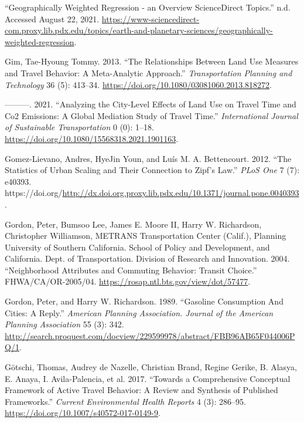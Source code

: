 \documentclass[
  11pt,
  openany]{memoir}
\newlength{\cslhangindent}
\newlength{\cslentryspacingunit} %
\newenvironment{CSLReferences}[2] %
 {%
  \setlength{\parindent}{0pt}
  \ifodd #1
  \let\oldpar\par
  \def\par{\hangindent=\cslhangindent\oldpar}
  \fi
  \setlength{\parskip}{#2\cslentryspacingunit}
 }%
 {}
\begin{document}
\begin{CSLReferences}{1}{0}
\leavevmode{}%
{``Geographically {Weighted Regression} - an Overview \textbar{} {ScienceDirect Topics}.''} n.d. Accessed August 22, 2021. \url{https://www-sciencedirect-com.proxy.lib.pdx.edu/topics/earth-and-planetary-sciences/geographically-weighted-regression}.

\leavevmode{}%
Gim, Tae-Hyoung Tommy. 2013. {``The Relationships Between Land Use Measures and Travel Behavior: A Meta-Analytic Approach.''} \emph{Transportation Planning and Technology} 36 (5): 413--34. \url{https://doi.org/10.1080/03081060.2013.818272}.

\leavevmode{}%
---------. 2021. {``Analyzing the City-Level Effects of Land Use on Travel Time and {Co2} Emissions: A Global Mediation Study of Travel Time.''} \emph{International Journal of Sustainable Transportation} 0 (0): 1--18. \url{https://doi.org/10.1080/15568318.2021.1901163}.

\leavevmode{}%
Gomez-Lievano, Andres, HyeJin Youn, and Luís M. A. Bettencourt. 2012. {``The {Statistics} of {Urban Scaling} and {Their Connection} to {Zipf}'s {Law}.''} \emph{PLoS One} 7 (7): e40393. https://doi.org/\url{http://dx.doi.org.proxy.lib.pdx.edu/10.1371/journal.pone.0040393}.

\leavevmode{}%
Gordon, Peter, Bumsoo Lee, James E. Moore II, Harry W. Richardson, Christopher Williamson, METRANS Transportation Center (Calif.), Planning University of Southern California. School of Policy and Development, and California. Dept. of Transportation. Division of Research and Innovation. 2004. {``Neighborhood {Attributes} and {Commuting Behavior}: Transit {Choice}.''} FHWA/CA/OR-2005/04. \url{https://rosap.ntl.bts.gov/view/dot/57477}.

\leavevmode{}%
Gordon, Peter, and Harry W. Richardson. 1989. {``Gasoline {Consumption And Cities}: A {Reply}.''} \emph{American Planning Association. Journal of the American Planning Association} 55 (3): 342. \url{http://search.proquest.com/docview/229599978/abstract/FBB96AB65F044006PQ/1}.

\leavevmode{}%
Götschi, Thomas, Audrey de Nazelle, Christian Brand, Regine Gerike, B. Alasya, E. Anaya, I. Avila-Palencia, et al. 2017. {``Towards a {Comprehensive Conceptual Framework} of {Active Travel Behavior}: A {Review} and {Synthesis} of {Published Frameworks}.''} \emph{Current Environmental Health Reports} 4 (3): 286--95. \url{https://doi.org/10.1007/s40572-017-0149-9}.


\end{CSLReferences}
\end{document}
